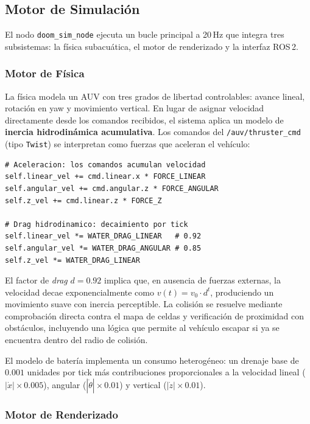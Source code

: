 \documentclass[10pt,twocolumn,letterpaper]{article}
\begin{document}
\subsection{Motor de Simulación}

El nodo \texttt{doom\_sim\_node} ejecuta un bucle principal a 20\,Hz que integra tres subsistemas: la física subacuática, el motor de renderizado y la interfaz ROS\,2.

\subsubsection{Motor de Física}

La física modela un AUV con tres grados de libertad controlables: avance lineal, rotación en yaw y movimiento vertical. En lugar de asignar velocidad directamente desde los comandos recibidos, el sistema aplica un modelo de \textbf{inercia hidrodinámica acumulativa}. Los comandos del \texttt{/auv/thruster\_cmd} (tipo \texttt{Twist}) se interpretan como fuerzas que aceleran el vehículo:

\begin{lstlisting}[caption={Modelo de aceleraci\'on y drag hidr\'aulico.}, label={lst:physics}]
# Aceleracion: los comandos acumulan velocidad
self.linear_vel += cmd.linear.x * FORCE_LINEAR
self.angular_vel += cmd.angular.z * FORCE_ANGULAR
self.z_vel += cmd.linear.z * FORCE_Z

# Drag hidrodinamico: decaimiento por tick
self.linear_vel *= WATER_DRAG_LINEAR   # 0.92
self.angular_vel *= WATER_DRAG_ANGULAR # 0.85
self.z_vel *= WATER_DRAG_LINEAR
\end{lstlisting}

El factor de \textit{drag} $d = 0.92$ implica que, en ausencia de fuerzas externas, la velocidad decae exponencialmente como $v(t) = v_0 \cdot d^t$, produciendo un movimiento suave con inercia perceptible. La colisión se resuelve mediante comprobación directa contra el mapa de celdas y verificación de proximidad con obstáculos, incluyendo una lógica que permite al vehículo escapar si ya se encuentra dentro del radio de colisión.

El modelo de batería implementa un consumo heterogéneo: un drenaje base de $0.001$ unidades por tick más contribuciones proporcionales a la velocidad lineal ($|\dot{x}| \times 0.005$), angular ($|\dot{\theta}| \times 0.01$) y vertical ($|\dot{z}| \times 0.01$).

\subsubsection{Motor de Renderizado}
\end{document}

